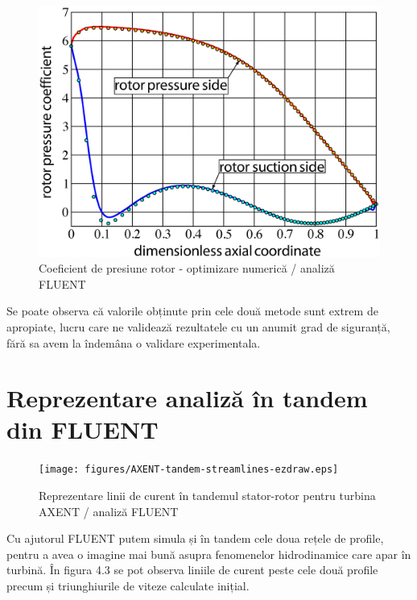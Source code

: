\begin{figure}[h]
	\centering
	\includegraphics[scale=0.5]{figures/cp-rotor-ezdraw.eps}
	\caption{Coeficient de presiune rotor - optimizare numerică / analiză FLUENT}
	\label{Coeficient de presiune rotor - optimizare numerică / analiză FLUENT}
\end{figure}

Se poate observa că valorile obținute prin cele două metode sunt extrem de apropiate, lucru care ne validează rezultatele cu un anumit grad de siguranță, fără sa avem la îndemâna o validare experimentala.

\clearpage


\section{Reprezentare analiză în tandem din FLUENT}

\begin{figure}[h]
	\centering
	\texttt{[image: figures/AXENT-tandem-streamlines-ezdraw.eps]}
	\caption{Reprezentare linii de curent în tandemul stator-rotor pentru turbina AXENT / analiză FLUENT}
	\label{Reprezentare linii de curent în tandemul stator-rotor pentru turbina AXENT / analiză FLUENT}
\end{figure}

Cu ajutorul FLUENT putem simula și în tandem cele doua rețele de profile, pentru a avea o imagine mai bună asupra fenomenelor hidrodinamice care apar în turbină. În figura 4.3 se pot observa liniile de curent peste cele două profile precum și triunghiurile de viteze calculate inițial.

\clearpage